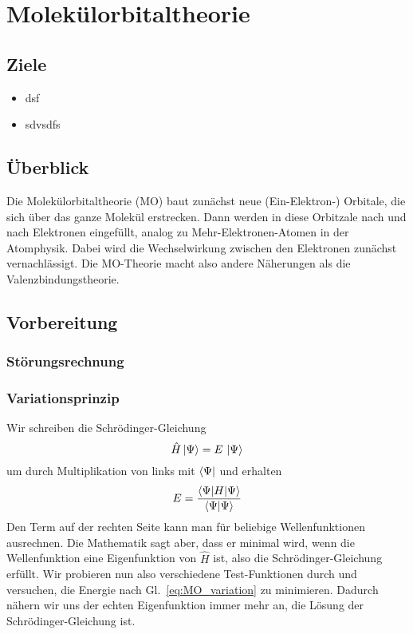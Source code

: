 \renewcommand{\lastmod}{April 29, 2020}

\chapter{Molekülorbitaltheorie}




\section{Ziele}

\begin{itemize}
\item dsf

\item sdvsdfs

\end{itemize}

\section{Überblick}

Die Molekülorbitaltheorie  (MO) baut zunächst neue (Ein-Elektron-) Orbitale, die sich über das ganze Molekül erstrecken. Dann werden in diese Orbitzale nach und nach Elektronen eingefüllt, analog zu Mehr-Elektronen-Atomen in der Atomphysik. Dabei wird die Wechselwirkung zwischen den Elektronen zunächst vernachlässigt. Die MO-Theorie macht also andere Näherungen als die Valenzbindungstheorie.


\section{Vorbereitung}

\subsection{Störungsrechnung}

\subsection{Variationsprinzip}

Wir schreiben die Schrödinger-Gleichung
\begin{equation}
 \hat{H} \ket{\Psi} = E \, \ket{\Psi} 
\end{equation}
um durch Multiplikation von links mit $\bra{\Psi}$ und erhalten
\begin{equation}
 E = \frac{\braket{\Psi | H | \Psi}} {\braket{\Psi | \Psi}}
 \label{eq:MO_variation}
\end{equation}
Den Term auf der rechten Seite kann man für beliebige Wellenfunktionen ausrechnen. Die Mathematik sagt aber, dass er minimal wird, wenn die Wellenfunktion eine Eigenfunktion von $\hat{H}$ ist, also die Schrödinger-Gleichung erfüllt. Wir probieren nun also verschiedene Test-Funktionen durch und versuchen, die Energie nach Gl.~\ref{eq:MO_variation} zu minimieren. Dadurch nähern wir uns der echten Eigenfunktion immer mehr an, die Lösung der Schrödinger-Gleichung ist.

